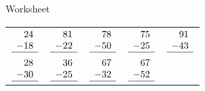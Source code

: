 \documentclass[20pt]{scrartcl}
\begin{document}
	\begin{center}
		\LARGE Worksheet
	\end{center}
	\begin{tabu} to \linewidth {XXXXX}
		$\begin{array}{r}
			24 \\
			-18 \\
			\hline
			\end{array}$
		
		&
		$\begin{array}{r}
			81 \\
			-22 \\
			\hline
			\end{array}$
		
		&
		$\begin{array}{r}
			78 \\
			-50 \\
			\hline
			\end{array}$
		
		&
		$\begin{array}{r}
			75 \\
			-25 \\
			\hline
			\end{array}$
		
		&
		$\begin{array}{r}
			91 \\
			-43 \\
			\hline
			\end{array}$
		

		\\
		$\begin{array}{r}
			28 \\
			-30 \\
			\hline
			\end{array}$
		
		&
		$\begin{array}{r}
			36 \\
			-25 \\
			\hline
			\end{array}$
		
		&
		$\begin{array}{r}
			67 \\
			-32 \\
			\hline
			\end{array}$
		
		&
		$\begin{array}{r}
			67 \\
			-52 \\
			\hline
			\end{array}$
		

\end{tabu}
\end{document}
